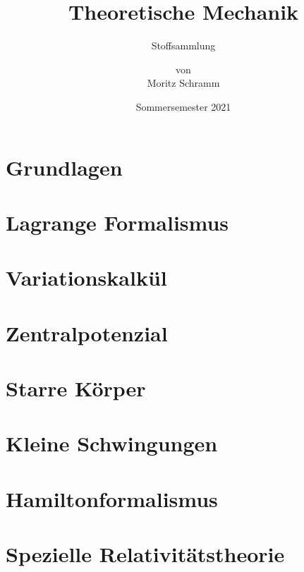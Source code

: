 \documentclass[a4paper, 12pt]{report}
\institute{Universität Bayreuth}
\title{Theoretische Mechanik}
\subtitle{Stoffsammlung}
\author{von\\Moritz Schramm}%
\date{Sommersemester 2021}
\begin{document}
    \maketitle
    \romantableofcontents

    \chapter{Grundlagen}
    
    
    \chapter{Lagrange Formalismus}
    
    
	\chapter{Variationskalkül}
	
	
	\chapter{Zentralpotenzial}
	
	
	\chapter{Starre Körper}
	
	
	\chapter{Kleine Schwingungen}
	
	
	\chapter{Hamiltonformalismus}
	
	
	\chapter{Spezielle Relativitätstheorie}
	
\end{document}

